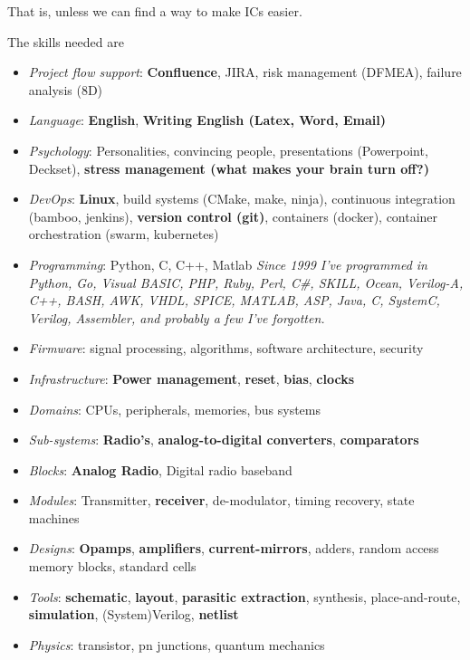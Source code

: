 That is, unless we can find a way to make ICs easier.

The skills needed are

\begin{itemize}
\tightlist
\item
  \emph{Project flow support}: \textbf{Confluence}, JIRA, risk
  management (DFMEA), failure analysis (8D)
\item
  \emph{Language}: \textbf{English}, \textbf{Writing English (Latex,
  Word, Email)}
\item
  \emph{Psychology}: Personalities, convincing people, presentations
  (Powerpoint, Deckset), \textbf{stress management (what makes your
  brain turn off?)}
\item
  \emph{DevOps}: \textbf{Linux}, build systems (CMake, make, ninja),
  continuous integration (bamboo, jenkins), \textbf{version control
  (git)}, containers (docker), container orchestration (swarm,
  kubernetes)
\item
  \emph{Programming}: Python, C, C++, Matlab \emph{Since 1999 I've
  programmed in Python, Go, Visual BASIC, PHP, Ruby, Perl, C\#, SKILL,
  Ocean, Verilog-A, C++, BASH, AWK, VHDL, SPICE, MATLAB, ASP, Java, C,
  SystemC, Verilog, Assembler, and probably a few I've forgotten.}
\item
  \emph{Firmware}: signal processing, algorithms, software architecture,
  security
\item
  \emph{Infrastructure}: \textbf{Power management}, \textbf{reset},
  \textbf{bias}, \textbf{clocks}
\item
  \emph{Domains}: CPUs, peripherals, memories, bus systems
\item
  \emph{Sub-systems}: \textbf{Radio's}, \textbf{analog-to-digital
  converters}, \textbf{comparators}
\item
  \emph{Blocks}: \textbf{Analog Radio}, Digital radio baseband
\item
  \emph{Modules}: Transmitter, \textbf{receiver}, de-modulator, timing
  recovery, state machines
\item
  \emph{Designs}: \textbf{Opamps}, \textbf{amplifiers},
  \textbf{current-mirrors}, adders, random access memory blocks,
  standard cells
\item
  \emph{Tools}: \textbf{schematic}, \textbf{layout}, \textbf{parasitic
  extraction}, synthesis, place-and-route, \textbf{simulation},
  (System)Verilog, \textbf{netlist}
\item
  \emph{Physics}: transistor, pn junctions, quantum mechanics
\end{itemize}

